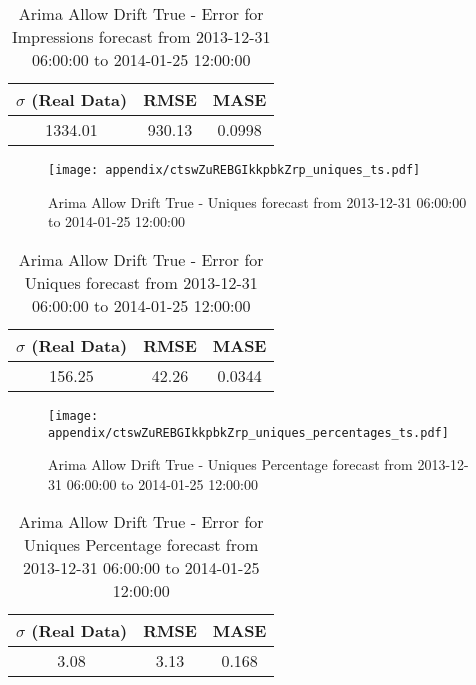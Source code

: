\begin{table}[H]
\centering
\footnotesize
\begin{tabular}{ccc}
$\sigma$ (Real Data) & RMSE & MASE   \\ \hline
1334.01 & 930.13 & 0.0998 \\
\end{tabular}

\vspace{0.5cm}

\caption[]{
Arima Allow Drift True - Error for Impressions forecast from 2013-12-31 06:00:00 to 2014-01-25 12:00:00}
\end{table}

\begin{figure}[H] \begin{center} \leavevmode
\texttt{[image: appendix/ctswZuREBGIkkpbkZrp\_uniques\_ts.pdf]} \caption[]{
Arima Allow Drift True - Uniques forecast from 2013-12-31 06:00:00 to 2014-01-25 12:00:00} \label{fig:appendix/ctswZuREBGIkkpbkZrp_uniques_ts.pdf} \end{center}
\end{figure}

\begin{table}[H]
\centering
\footnotesize
\begin{tabular}{ccc}
$\sigma$ (Real Data) & RMSE & MASE   \\ \hline
156.25 & 42.26 & 0.0344 \\
\end{tabular}

\vspace{0.5cm}

\caption[]{
Arima Allow Drift True - Error for Uniques forecast from 2013-12-31 06:00:00 to 2014-01-25 12:00:00}
\end{table}

\begin{figure}[H] \begin{center} \leavevmode
\texttt{[image: appendix/ctswZuREBGIkkpbkZrp\_uniques\_percentages\_ts.pdf]} \caption[]{
Arima Allow Drift True - Uniques Percentage forecast from 2013-12-31 06:00:00 to 2014-01-25 12:00:00} \label{fig:appendix/ctswZuREBGIkkpbkZrp_uniques_percentages_ts.pdf} \end{center}
\end{figure}

\begin{table}[H]
\centering
\footnotesize
\begin{tabular}{ccc}
$\sigma$ (Real Data) & RMSE & MASE   \\ \hline
3.08 & 3.13 & 0.168 \\
\end{tabular}

\vspace{0.5cm}

\caption[]{
Arima Allow Drift True - Error for Uniques Percentage forecast from 2013-12-31 06:00:00 to 2014-01-25 12:00:00}
\end{table}

